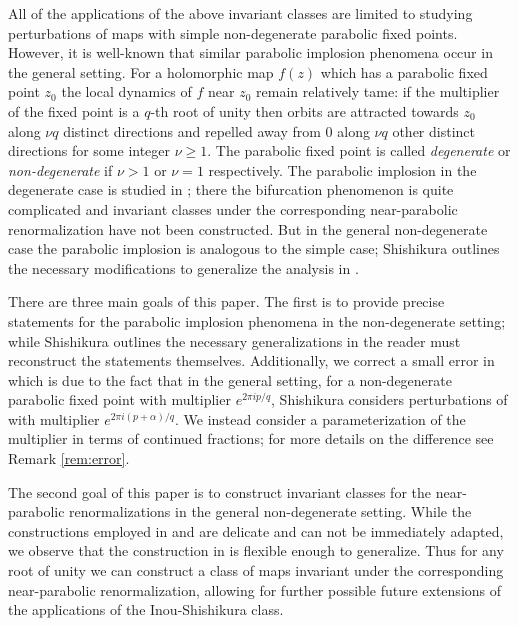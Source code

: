 \documentclass[12pt,letterpaper]{amsart}
\numberwithin{equation}{section}
\theoremstyle{remark}
\theoremstyle{definition}
\begin{document}
	All of the applications of the above invariant classes are limited to studying perturbations of maps with simple non-degenerate parabolic fixed points. However, it is well-known that similar parabolic implosion phenomena occur in the general setting.
	For a holomorphic map $f(z)$ which has a parabolic fixed point $z_0$ the local dynamics of $f$ near $z_0$ remain relatively tame: if the multiplier of the fixed point is a $q$-th root of unity then orbits are attracted towards $z_0$ along $\nu q$ distinct directions and repelled away from $0$ along $\nu q$ other distinct directions for some integer $\nu\geq 1$. The parabolic fixed point is called \textit{degenerate} or \textit{non-degenerate} if $\nu >1$ or $\nu= 1$ respectively. The parabolic implosion in the degenerate case is studied in \cite{Oudkerk}; there the bifurcation phenomenon is quite complicated and invariant classes under the corresponding near-parabolic renormalization have not been constructed.
	But in the general non-degenerate case the parabolic implosion is analogous to the simple case; Shishikura outlines the necessary modifications to generalize the analysis in \cite{shishikura_boundary}. 
	
	
	There are three main goals of this paper. The first is to
	provide precise statements for the parabolic implosion phenomena in the non-degenerate setting; while Shishikura outlines the necessary generalizations in \cite{shishikura_boundary} the reader must reconstruct the statements themselves. Additionally, we correct a small error in \cite{shishikura_boundary} which is due to the fact that in the general setting, for a non-degenerate parabolic fixed point with multiplier $e^{2\pi i p/q}$,  Shishikura considers perturbations of with multiplier $e^{2\pi i (p+\alpha)/q}$. We instead consider a parameterization of the multiplier in terms of continued fractions; for more details on the difference see Remark \ref{rem:error}.
%	
%	

	The second goal of this paper is to construct invariant classes for the near-parabolic renormalizations in the general non-degenerate setting. 
	While the constructions employed in  \cite{shishikura} and \cite{Yang} are delicate and can not be immediately adapted, we observe that the construction in \cite{Cheritat22} is flexible enough to generalize. Thus for any root of unity we can construct  a class of maps invariant under the corresponding near-parabolic renormalization, allowing for further possible future extensions of the applications of the Inou-Shishikura class. 
	
\end{document}
